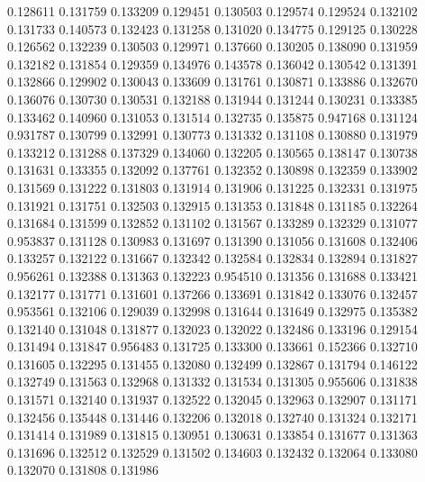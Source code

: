 0.128611
0.131759
0.133209
0.129451
0.130503
0.129574
0.129524
0.132102
0.131733
0.140573
0.132423
0.131258
0.131020
0.134775
0.129125
0.130228
0.126562
0.132239
0.130503
0.129971
0.137660
0.130205
0.138090
0.131959
0.132182
0.131854
0.129359
0.134976
0.143578
0.136042
0.130542
0.131391
0.132866
0.129902
0.130043
0.133609
0.131761
0.130871
0.133886
0.132670
0.136076
0.130730
0.130531
0.132188
0.131944
0.131244
0.130231
0.133385
0.133462
0.140960
0.131053
0.131514
0.132735
0.135875
0.947168
0.131124
0.931787
0.130799
0.132991
0.130773
0.131332
0.131108
0.130880
0.131979
0.133212
0.131288
0.137329
0.134060
0.132205
0.130565
0.138147
0.130738
0.131631
0.133355
0.132092
0.137761
0.132352
0.130898
0.132359
0.133902
0.131569
0.131222
0.131803
0.131914
0.131906
0.131225
0.132331
0.131975
0.131921
0.131751
0.132503
0.132915
0.131353
0.131848
0.131185
0.132264
0.131684
0.131599
0.132852
0.131102
0.131567
0.133289
0.132329
0.131077
0.953837
0.131128
0.130983
0.131697
0.131390
0.131056
0.131608
0.132406
0.133257
0.132122
0.131667
0.132342
0.132584
0.132834
0.132894
0.131827
0.956261
0.132388
0.131363
0.132223
0.954510
0.131356
0.131688
0.133421
0.132177
0.131771
0.131601
0.137266
0.133691
0.131842
0.133076
0.132457
0.953561
0.132106
0.129039
0.132998
0.131644
0.131649
0.132975
0.135382
0.132140
0.131048
0.131877
0.132023
0.132022
0.132486
0.133196
0.129154
0.131494
0.131847
0.956483
0.131725
0.133300
0.133661
0.152366
0.132710
0.131605
0.132295
0.131455
0.132080
0.132499
0.132867
0.131794
0.146122
0.132749
0.131563
0.132968
0.131332
0.131534
0.131305
0.955606
0.131838
0.131571
0.132140
0.131937
0.132522
0.132045
0.132963
0.132907
0.131171
0.132456
0.135448
0.131446
0.132206
0.132018
0.132740
0.131324
0.132171
0.131414
0.131989
0.131815
0.130951
0.130631
0.133854
0.131677
0.131363
0.131696
0.132512
0.132529
0.131502
0.134603
0.132432
0.132064
0.133080
0.132070
0.131808
0.131986
